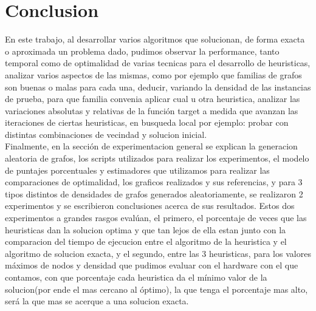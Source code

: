 \section{Conclusion}
En este trabajo, al desarrollar varios algoritmos que solucionan, de forma exacta o aproximada un problema dado, pudimos observar la performance, tanto temporal como de optimalidad de varias tecnicas para el desarrollo de heuristicas, analizar varios aspectos de las mismas, como por ejemplo que familias de grafos son buenas o malas para cada una, deducir, variando la densidad de las instancias de prueba, para que familia convenia aplicar cual u otra heuristica, analizar las variaciones absolutas y relativas de la funci\'on target a medida que avanzan las iteraciones de ciertas heuristicas, en busqueda local por ejemplo: probar con distintas combinaciones de vecindad y solucion inicial.\\
\vspace{0.5cm}
Finalmente, en la secci\'on de experimentacion general se explican la generacion aleatoria de grafos, los scripts utilizados para realizar los experimentos, el modelo de puntajes porcentuales y estimadores que utilizamos para realizar las comparaciones de optimalidad, los graficos realizados y sus referencias, y para 3 tipos distintos de densidades de grafos generados aleatoriamente, se realizaron 2 experimentos y se escribieron conclusiones acerca de sus resultados. Estos dos experimentos a grandes rasgos eval\'uan, el primero, el porcentaje de veces que las heuristicas dan la solucion optima y que tan lejos de ella estan junto con la comparacion del tiempo de ejecucion entre el algoritmo de la heuristica y el algoritmo de solucion exacta, y el segundo, entre las 3 heuristicas, para los valores m\'aximos de nodos y densidad que pudimos evaluar con el hardware con el que contamos, con que porcentaje cada heuristica da el m\'inimo valor de la solucion(por ende el mas cercano al \'optimo), la que tenga el porcentaje mas alto, ser\'a la que mas se acerque a una solucion exacta.
\vspace{0.5cm}
